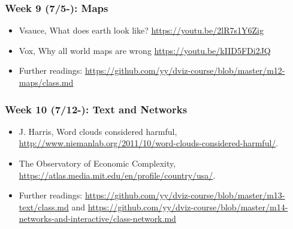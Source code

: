 
\subsubsection{Week 9 (7/5-): Maps }%

\begin{itemize}\itemsep0em 
\item Vsauce, What does earth look like? \url{https://youtu.be/2lR7s1Y6Zig}
\item Vox, Why all world maps are wrong \url{https://youtu.be/kIID5FDi2JQ}
\item Further readings: \url{https://github.com/yy/dviz-course/blob/master/m12-maps/class.md}
\end{itemize}	
\subsubsection{Week 10 (7/12-): Text and Networks } %

\begin{itemize}\itemsep0em 
\item J. Harris, Word clouds considered harmful, \url{http://www.niemanlab.org/2011/10/word-clouds-considered-harmful/}. 
\item The Observatory of Economic Complexity, \url{https://atlas.media.mit.edu/en/profile/country/usa/}.
\item Further readings: \url{https://github.com/yy/dviz-course/blob/master/m13-text/class.md} and \url{https://github.com/yy/dviz-course/blob/master/m14-networks-and-interactive/class-network.md}
\end{itemize}	
